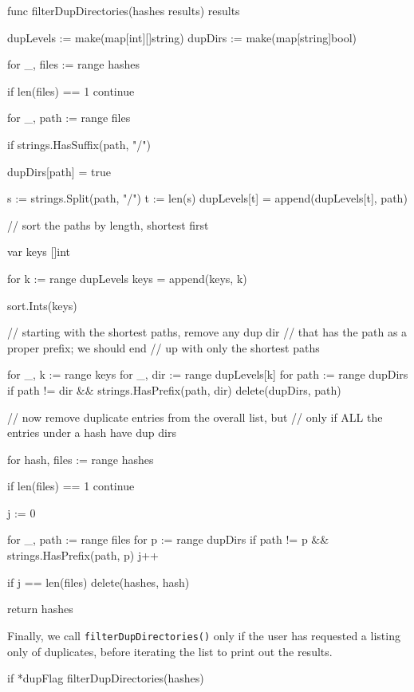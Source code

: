 \documentclass[12pt,notitlepage]{article}
\begin{document}
\begin{golang} 
func filterDupDirectories(hashes results) results {
	dupLevels := make(map[int][]string)
	dupDirs := make(map[string]bool)

	for _, files := range hashes {
		if len(files) == 1 {
			continue
		}

		for _, path := range files {
			if strings.HasSuffix(path, "/") {
				dupDirs[path] = true

				s := strings.Split(path, "/")
				t := len(s)
				dupLevels[t] = append(dupLevels[t], path)
			}
		}
	}

	// sort the paths by length, shortest first

	var keys []int

	for k := range dupLevels {
		keys = append(keys, k)
	}

	sort.Ints(keys)

	// starting with the shortest paths, remove any dup dir
	// that has the path as a proper prefix; we should end
	// up with only the shortest paths

	for _, k := range keys {
		for _, dir := range dupLevels[k] {
			for path := range dupDirs {
				if path != dir && strings.HasPrefix(path, dir) {
					delete(dupDirs, path)
				}
			}
		}
	}

	// now remove duplicate entries from the overall list, but
	// only if ALL the entries under a hash have dup dirs

	for hash, files := range hashes {
		if len(files) == 1 {
			continue
		}

		j := 0

		for _, path := range files {
			for p := range dupDirs {
				if path != p && strings.HasPrefix(path, p) {
					j++
				}
			}
		}

		if j == len(files) {
			delete(hashes, hash)
		}
	}

	return hashes
}
\end{golang}

Finally, we call \verb|filterDupDirectories()| only if the user has requested
a listing only of duplicates, before iterating the list to print out the results.

\begin{golang}
	if *dupFlag {
		filterDupDirectories(hashes)
	}
\end{golang}
\end{document}
